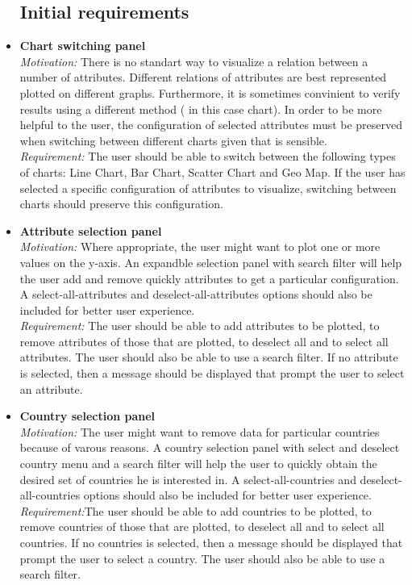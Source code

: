\documentclass[a4paper]{article}
\begin{document}
\begin{itemize}

\subsection{Initial requirements}


\item[\checkmark]{\textbf{Chart switching panel}
\\\textit{Motivation:} There is no standart way to visualize a relation between a number of attributes. Different relations of attributes are best represented plotted on different graphs. Furthermore, it is sometimes convinient to verify results using a different method ( in this case chart). In order to be more helpful to the user, the configuration of selected attributes must be preserved when switching between different charts given that is sensible.
\\\textit{Requirement:} The user should be able to switch between the following types of charts: Line Chart, Bar Chart, Scatter Chart and Geo Map. If the user has selected a specific configuration of attributes to visualize, switching between charts should preserve this configuration.
}


\item[\checkmark]{\textbf{Attribute selection panel}
\\\textit{Motivation:} Where appropriate, the user might want to plot one or more values on the y-axis. An expandble selection panel with search filter will help the user add and remove quickly attributes to get a particular configuration. A select-all-attributes and deselect-all-attributes options should also be included for better user experience.
\\\textit{Requirement:} The user should be able to add attributes to be plotted, to remove attributes of those that are plotted, to deselect all and to select all attributes. The user should also be able to use a search filter. If no attribute is selected, then a message should be displayed that prompt the user to select an attribute.
}


\item[\checkmark]{\textbf{Country selection panel}
\\\textit{Motivation:} The user might want to remove data for particular countries because of varous reasons. A country selection panel with select and deselect country menu and a search filter will help the user to quickly obtain the desired set of countries he is interested in. A select-all-countries and deselect-all-countries options should also be included for better user experience.
\\\textit{Requirement:}The user should be able to add countries to be plotted, to remove countries of those that are plotted, to deselect all and to select all countries. If no countries is selected, then a message should be displayed that prompt the user to select a country. The user should also be able to use a search filter.
}


\end{itemize}
\end{document}
